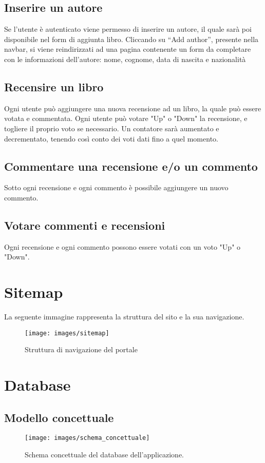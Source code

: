 \documentclass[italian]{article}
\begin{document}
\subsection{Inserire un autore}
Se l'utente è autenticato viene permesso di inserire un autore, il quale sarà poi disponibile nel form di aggiunta libro. Cliccando su “Add author”, presente nella navbar, si viene reindirizzati ad una pagina contenente un form da completare con le informazioni dell’autore: nome, cognome, data di nascita e nazionalità

\subsection{Recensire un libro}
Ogni utente può aggiungere una nuova recensione ad un libro, la quale può essere votata e commentata. Ogni utente può votare "Up" o "Down" la recensione, e togliere il proprio voto se necessario. Un contatore sarà aumentato e decrementato, tenendo così conto dei voti dati fino a quel momento. 

\subsection{Commentare una recensione e/o un commento}
Sotto ogni recensione e ogni commento è possibile aggiungere un nuovo commento.

\subsection{Votare commenti e recensioni}
Ogni recensione e ogni commento possono essere votati con un voto "Up" o "Down".

\pagebreak
\section{Sitemap}
La seguente immagine rappresenta la struttura del sito e la sua navigazione.
\begin{figure}[h]
	\centering
	\texttt{[image: images/sitemap]}
	\caption[Sitemap]{Struttura di navigazione del portale}
	\label{fig:sitemap}
\end{figure}

\pagebreak
\section{Database}
\subsection{Modello concettuale}
\begin{figure}[h]
	\centering
	\texttt{[image: images/schema\_concettuale]}
	\caption[Schema concettuale]{Schema concettuale del database dell'applicazione.}
	\label{fig:schemaconcettuale}
\end{figure}
\pagebreak
\end{document}
